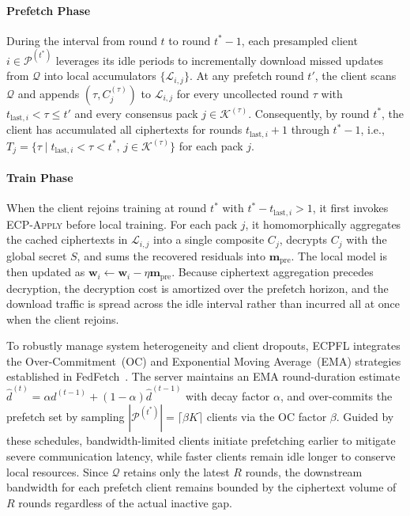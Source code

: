\documentclass[10pt,conference]{IEEEtran}
\begin{document}
\paragraph{Prefetch Phase}
During the interval from round $t$ to round $t^*-1$, each presampled client $i\in\mathcal{P}^{(t^*)}$ leverages its idle periods to incrementally download missed updates from $\mathcal{Q}$ into local accumulators $\{\mathcal{L}_{i,j}\}$. At any prefetch round $t'$, the client scans $\mathcal{Q}$ and appends $(\tau,C_j^{(\tau)})$ to $\mathcal{L}_{i,j}$ for every uncollected round $\tau$ with $t_{\mathrm{last},i}<\tau\le t'$ and every consensus pack $j\in\mathcal{K}^{(\tau)}$. Consequently, by round $t^*$, the client has accumulated all ciphertexts for rounds $t_{\mathrm{last},i}+1$ through $t^*-1$, i.e., $T_j=\{\tau\mid t_{\mathrm{last},i}<\tau<t^*,\,j\in\mathcal{K}^{(\tau)}\}$ for each pack $j$.

\paragraph{Train Phase}
When the client rejoins training at round $t^*$ with $t^*-t_{\mathrm{last},i}>1$, it first invokes \textsc{ECP-Apply} before local training. For each pack $j$, it homomorphically aggregates the cached ciphertexts in $\mathcal{L}_{i,j}$ into a single composite $C_j$, decrypts $C_j$ with the global secret $S$, and sums the recovered residuals into $\mathbf{m}_{\mathrm{pre}}$. The local model is then updated as $\mathbf{w}_i\leftarrow\mathbf{w}_i-\eta\mathbf{m}_{\mathrm{pre}}$. Because ciphertext aggregation precedes decryption, the decryption cost is amortized over the prefetch horizon, and the download traffic is spread across the idle interval rather than incurred all at once when the client rejoins.

To robustly manage system heterogeneity and client dropouts, \textsc{ECPFL} integrates the Over-Commitment~(OC) and Exponential Moving Average~(EMA) strategies established in FedFetch~\cite{yan2025fedfetch}. The server maintains an EMA round-duration estimate $\hat{d}^{(t)}=\alpha d^{(t-1)}+(1-\alpha)\hat{d}^{(t-1)}$ with decay factor $\alpha$, and over-commits the prefetch set by sampling $|\mathcal{P}^{(t^*)}|=\lceil\beta K\rceil$ clients via the OC factor $\beta$. Guided by these schedules, bandwidth-limited clients initiate prefetching earlier to mitigate severe communication latency, while faster clients remain idle longer to conserve local resources. Since $\mathcal{Q}$ retains only the latest $R$ rounds, the downstream bandwidth for each prefetch client remains bounded by the ciphertext volume of $R$ rounds regardless of the actual inactive gap.
\end{document}
